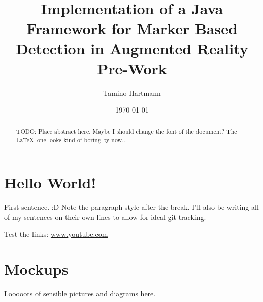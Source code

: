 \documentclass[a4paper]{article}
\begin{document}
\title{Implementation of a Java Framework for Marker Based Detection in Augmented Reality \\ {\large Pre-Work}}
\author{Tamino Hartmann}
\date{\today}

\maketitle

\begin{abstract}
TODO: Place abstract here.
Maybe I should change the font of the document?
The \LaTeX \ one looks kind of boring by now...
\end{abstract}

\newpage

\tableofcontents

\newpage

\section{Hello World!}

First sentence. :D
Note the paragraph style after the break.
I'll also be writing all of my sentences on their own lines to allow for ideal git tracking.

Test the links: \url{www.youtube.com}

\section{Mockups}

Looooots of sensible pictures and diagrams here.

\newpage

\end{document}
